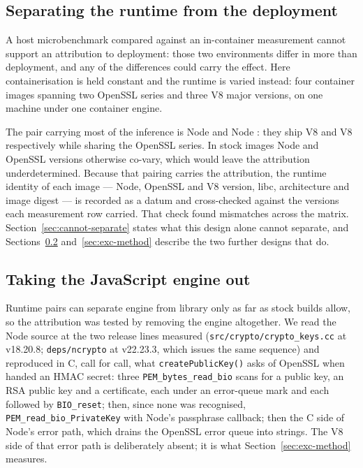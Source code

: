 \documentclass[pdflatex,sn-basic,twocolumn]{sn-jnl}%
\begin{document}
\subsection{Separating the runtime from the deployment}\label{sec:matrix-method}

A host microbenchmark compared against an in-container measurement cannot
support an attribution to deployment: those two environments differ in more than
deployment, and any of the differences could carry the effect. Here
containerisation is held constant and the runtime is varied instead:
four container images spanning two OpenSSL series and three V8 major versions,
on one machine under one container engine.

The pair carrying most of the inference is Node \NodeEighteenNodeMajor{} and
Node \NodeTwentyNodeMajor: they ship V8 \NodeEighteenVeight{} and V8
\NodeTwentyVeight{} respectively while sharing the OpenSSL
\NodeEighteenOpensslSeries{} series. In stock images Node and OpenSSL versions
otherwise co-vary, which would leave the attribution underdetermined. Because
that pairing carries the attribution, the runtime identity of each image ---
Node, OpenSSL and V8 version, libc, architecture and image digest --- is
recorded as a datum and cross-checked against the versions each measurement row
carried. That check found \IdentityMismatches{} mismatches across the matrix.
Section~\ref{sec:cannot-separate} states what this design alone cannot
separate, and Sections~\ref{sec:c-method} and~\ref{sec:exc-method} describe the
two further designs that do.

\subsection{Taking the JavaScript engine out}\label{sec:c-method}

Runtime pairs can separate engine from library only as far as stock builds
allow, so the attribution was tested by removing the engine altogether. We read
the Node source at the two release lines measured
(\texttt{src/crypto/crypto\_keys.cc} at v18.20.8; \texttt{deps/ncrypto} at
v22.23.3, which issues the same sequence) and reproduced in C, call for call,
what \texttt{createPublicKey()} asks of OpenSSL when handed an HMAC secret:
three \texttt{PEM\_bytes\_read\_bio} scans for a public key, an RSA public key
and a certificate, each under an error-queue mark and each followed by
\texttt{BIO\_reset}; then, since none was recognised,
\texttt{PEM\_read\_bio\_PrivateKey} with Node's passphrase callback; then the
C side of Node's error path, which drains the OpenSSL error queue into
strings. The V8 side of that error path is deliberately absent; it is what
Section~\ref{sec:exc-method} measures.
\end{document}
